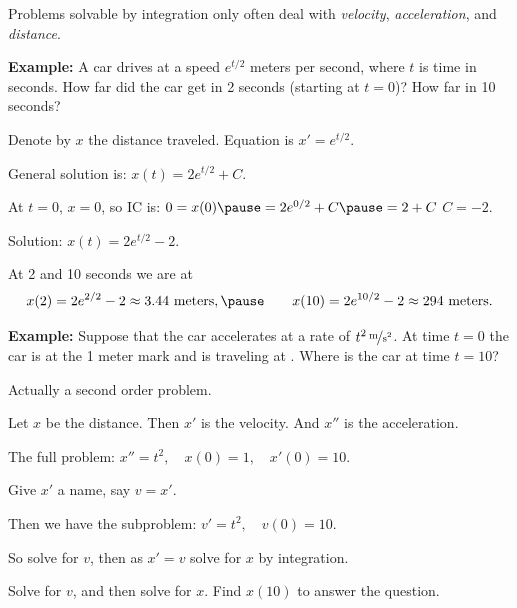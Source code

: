 \documentclass[10pt,aspectratio=169]{beamer}
\begin{document}
\begin{frame}
Problems solvable by integration only often deal
with \emph{velocity}, \emph{acceleration}, and \emph{distance}.

\medskip
\pause

\textbf{Example:}
A car drives at a speed $e^{t/2}$ meters per second, where $t$ is time in seconds.
How far did the car get in 2 seconds (starting at $t=0$)?  How far in 10 seconds?

\medskip
\pause

Denote by $x$ the distance traveled.
\pause
Equation is \quad $x' = e^{t/2}$.

\medskip
\pause

General solution is: \quad
$x(t) = 2 e^{t/2} + C$.

\medskip
\pause

At $t=0$, $x=0$, so IC is:
\quad
$0 = x(0) \pause = 2e^{0/2} + C \pause = 2 + C$
\pause
\wthus
$C=-2$.

\medskip
\pause

Solution: 
\quad
$x(t) = 2 e^{t/2} - 2$.

\medskip
\pause

At 2 and 10 seconds we are at
\begin{equation*}
x(2) = 2e^{2/2} - 2 \approx 3.44 \text{ meters} ,
\pause
\qquad
x(10) = 2e^{10/2} - 2 \approx 294 \text{ meters} .
\end{equation*}
\end{frame}

\begin{frame}
\textbf{Example:}
Suppose that the car accelerates at a rate of $\unitfrac[t^2]{m}{s^2}$.
\pause
At time $t=0$ the car is at the 1 meter mark and is traveling at
.
\pause
Where is the car at time $t=10$?

\medskip
\pause

Actually a second order problem.

\medskip
\pause

Let $x$ be the distance.
\quad
Then $x'$ is the velocity.
\quad
And $x''$ is the acceleration.

\medskip
\pause

The full problem: \quad $x'' = t^2 , \quad x(0) = 1 , \quad x'(0) = 10$.

\medskip
\pause

Give $x'$ a name, say $v=x'$.

\medskip
\pause

Then we have the subproblem: \quad 
$v' = t^2, \quad v(0) = 10$.

\medskip
\pause

So solve for $v$, then as $x'=v$ solve for $x$ by integration.

\pause

\begin{exercise}
Solve for $v$, and then solve for $x$.  Find $x(10)$ to answer the
question.
\end{exercise}

\end{frame}
\end{document}
